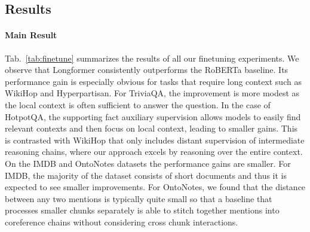 \documentclass[11pt,a4paper]{article}
\newcommand{\model}{Longformer\xspace}
\begin{document}
\subsection{Results}


\paragraph{Main Result}
Tab.~\ref{tab:finetune} summarizes the results of all our finetuning experiments. We observe that \model consistently outperforms the RoBERTa baseline. 
Its performance gain is especially obvious for tasks that require long context such as WikiHop and Hyperpartisan.
For TriviaQA, the improvement is more modest as the local context is often sufficient to answer the question.
In the case of HotpotQA, the supporting fact auxiliary supervision allows models to easily find relevant contexts and then focus on local context, leading to smaller gains.  This is contrasted with WikiHop that only includes distant supervision of intermediate reasoning chains, where our approach excels by reasoning over the entire context.
On the IMDB and OntoNotes datasets the performance gains are smaller. For IMDB, the majority of the dataset consists of short documents and thus it is expected to see smaller improvements.
For OntoNotes, we found that the distance between any two mentions is typically quite small so that a baseline that processes smaller chunks separately is able to stitch together mentions into coreference chains without considering cross chunk interactions.
\end{document}
